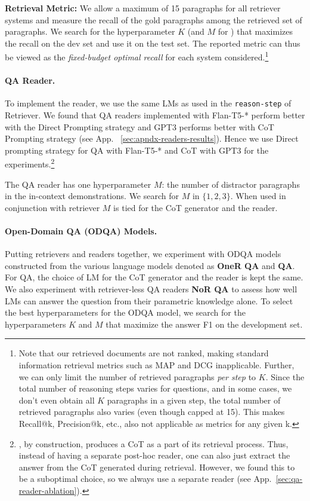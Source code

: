 \textbf{Retrieval Metric:} We allow a maximum of 15 paragraphs for all retriever systems and measure the recall of the gold paragraphs among the retrieved set of paragraphs. We search for the hyperparameter $K$ (and $M$ for \iconsys) that maximizes the recall on the dev set and use it on the test set. The reported metric can thus be viewed as the \emph{fixed-budget optimal recall} for each system considered.\footnote{\label{footnote:retrieval-metric}Note that our retrieved documents are not ranked, making standard information retrieval metrics such as MAP and DCG inapplicable. Further, we can only limit the number of retrieved paragraphs \emph{per step} to $K$. Since the total number of reasoning steps varies for questions, and in some cases, we don't even obtain all $K$ paragraphs in a given step, the total number of retrieved paragraphs also varies (even though capped at 15). This makes Recall@k, Precision@k, etc., also not applicable as metrics for any given k.}

\paragraph{QA Reader.} To implement the reader, we use the same LMs as used in the \texttt{reason-step} of \iconsys Retriever. We found that QA readers implemented with Flan-T5-* perform better with the Direct Prompting strategy and GPT3 performs better with CoT Prompting strategy (see App. ~\ref{sec:apndx-readers-results}). Hence we use Direct prompting strategy for QA with Flan-T5-* and CoT with GPT3 for the experiments.\footnote{\iconsys, by construction, produces a CoT as a part of its retrieval process. Thus, instead of having a separate post-hoc reader, one can also just extract the answer from the CoT generated during retrieval. However, we found this to be a suboptimal choice, so we always use a separate reader (see App.~\ref{sec:qa-reader-ablation}).}

The QA reader has one hyperparameter $M$: the number of distractor paragraphs in the in-context demonstrations. We search for $M$ in $\{1, 2, 3\}$. When used in conjunction with \iconsys retriever $M$ is tied for the CoT generator and the reader.

\paragraph{Open-Domain QA (ODQA) Models.} Putting retrievers and readers together, we experiment with ODQA models constructed from the various language models denoted as \textbf{OneR QA} and \textbf{\iconsys QA}. For \iconsys QA, the choice of LM for the CoT generator and the reader is kept the same. We also experiment with retriever-less QA readers \textbf{NoR QA} to assess how well LMs can answer the question from their parametric knowledge alone. To select the best hyperparameters for the ODQA model, we search for the hyperparameters $K$ and $M$ that maximize the answer F1 on the development set.

